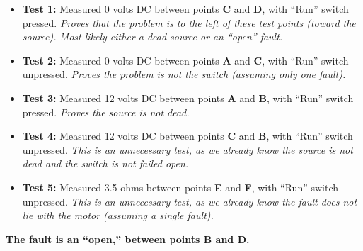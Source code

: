 \eject






\begin{itemize}
\item{} {\bf Test 1:} Measured 0 volts DC between points {\bf C} and {\bf D}, with ``Run'' switch pressed.  {\it Proves that the problem is to the left of these test points (toward the source).  Most likely either a dead source or an ``open'' fault.}
\vskip 5pt
\item{} {\bf Test 2:} Measured 0 volts DC between points {\bf A} and {\bf C}, with ``Run'' switch unpressed.  {\it Proves the problem is not the switch (assuming only one fault).}
\vskip 5pt
\item{} {\bf Test 3:} Measured 12 volts DC between points {\bf A} and {\bf B}, with ``Run'' switch pressed.  {\it Proves the source is not dead.}
\vskip 5pt
\item{} {\bf Test 4:} Measured 12 volts DC between points {\bf C} and {\bf B}, with ``Run'' switch unpressed.  {\it This is an unnecessary test, as we already know the source is not dead and the switch is not failed open.}
\vskip 5pt
\item{} {\bf Test 5:} Measured 3.5 ohms between points {\bf E} and {\bf F}, with ``Run'' switch unpressed.  {\it This is an unnecessary test, as we already know the fault does not lie with the motor (assuming a single fault).}
\end{itemize}

\vskip 10pt

{\bf The fault is an ``open,'' between points B and D.}











